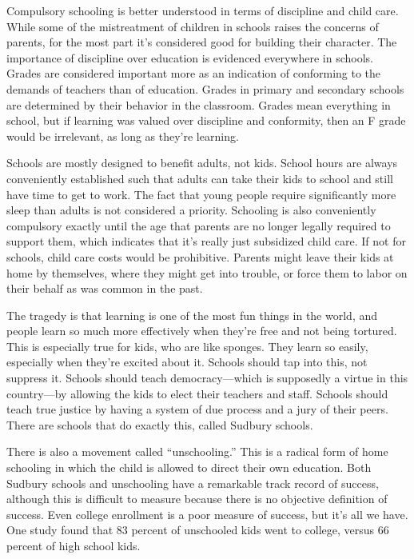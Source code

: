 Compulsory schooling is better understood in terms of discipline and child care. While some of the mistreatment of children in schools raises the concerns of parents, for the most part it's considered good for building their character. The importance of discipline over education is evidenced everywhere in schools. Grades are considered important more as an indication of conforming to the demands of teachers than of education. Grades in primary and secondary schools are determined by their behavior in the classroom. Grades mean everything in school, but if learning was valued over discipline and conformity, then an F grade would be irrelevant, as long as they're learning.

Schools are mostly designed to benefit adults, not kids. School hours are always conveniently established such that adults can take their kids to school and still have time to get to work. The fact that young people require significantly more sleep than adults is not considered a priority. Schooling is also conveniently compulsory exactly until the age that parents are no longer legally required to support them, which indicates that it's really just subsidized child care. If not for schools, child care costs would be prohibitive. Parents might leave their kids at home by themselves, where they might get into trouble, or force them to labor on their behalf as was common in the past.

The tragedy is that learning is one of the most fun things in the world, and people learn so much more effectively when they're free and not being tortured. This is especially true for kids, who are like sponges. They learn so easily, especially when they're excited about it. Schools should tap into this, not suppress it. Schools should teach democracy---which is supposedly a virtue in this country---by allowing the kids to elect their teachers and staff. Schools should teach true justice by having a system of due process and a jury of their peers. There are schools that do exactly this, called Sudbury schools.\cite{sudbury-valley-school}

There is also a movement called ``unschooling.'' This is a radical form of home schooling in which the child is allowed to direct their own education. Both Sudbury schools and unschooling have a remarkable track record of success, although this is difficult to measure because there is no objective definition of success. Even college enrollment is a poor measure of success, but it's all we have. One study found that 83 percent of unschooled kids went to college,\cite{unschooling-psychology-today} versus 66 percent of high school kids.\cite{college-nytimes}

